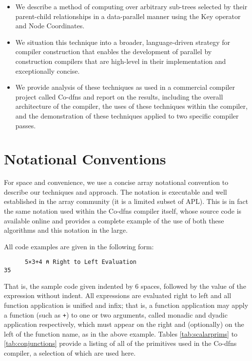 \documentclass[numbers,preprint]{sigplanconf}
\begin{document}
\begin{itemize}[noitemsep]

\item We describe a method of computing over arbitrary sub-trees
selected by their parent-child relationships in a data-parallel manner
using the Key operator and Node Coordinates.

\item We situation this technique into a broader, language-driven 
strategy for compiler construction that enables the development of parallel 
by construction compilers that are high-level in their implementation and 
exceptionally concise.

\item We provide analysis of these techniques as used in a commercial
compiler project called Co-dfns and report on the results,
including the overall architecture of the compiler, the uses of these 
techniques within the compiler, and the demonstration of these techniques 
applied to two specific compiler passes.

\end{itemize}

\section{Notational Conventions}

For space and convenience, we use a concise array notational convention to 
describe our techniques and approach. The notation is executable and well 
established in the array community (it is a limited subset of APL). This is 
in fact the same notation used within the Co-dfns compiler itself, whose 
source code is available online and provides a complete example of the use 
of both these algorithms and this notation in the large. 

All code examples are given in the following form:

\begin{verbatim}
      5×3+4 ⍝ Right to Left Evaluation
35
\end{verbatim}

That is, the sample code given indented by 6 spaces, followed by the value 
of the expression without indent. All expressions are evaluated right to 
left and all function application is unified and infix; that is, a function 
application may apply a function (such as \verb;+;) to one or two arguments, 
called monadic and dyadic application respectively,
which must appear on the right and (optionally) on the left of the function 
name, as in the above example. Tables \ref{tab:scalarprims} to 
\ref{tab:conjunctions}
provide a listing of all of the primitives used in the Co-dfns compiler, 
a selection of which are used here. 
\end{document}

